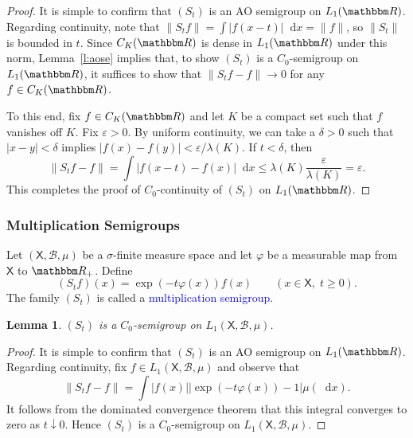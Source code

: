 \documentclass[12pt, reqno]{amsart}
\renewcommand{\leq}{\leqslant}
\renewcommand{\geq}{\geqslant}
\newcommand{\1}{\mathbbm 1}
\newcommand*\diff{\mathop{}\!\mathrm{d}}
\newcommand{\bB}{\mathcal B}
\newcommand{\RR}{\mathbbm R}
\newcommand{\Xsf}{\mathsf X}
\renewcommand{\phi}{\varphi}
\renewcommand{\epsilon}{\varepsilon}
\theoremstyle{plain}
\newtheorem{lemma}[theorem]{Lemma}
\theoremstyle{definition}
\newcommand{\navy}[1]{\textcolor{blue}{#1}}
\begin{document}
\begin{proof}
    It is simple to confirm that $(S_t)$ is an AO semigroup on $L_1(\RR)$.
    Regarding continuity, note that $\|S_t f\| = \int |f(x-t)| \diff x = \| f\|$, so
    $\|S_t\|$ is bounded in $t$.  Since $C_K(\RR)$ is dense in $L_1(\RR)$ under this
    norm, Lemma~\ref{l:aose} implies that, to show $(S_t)$ is a $C_0$-semigroup
    on $L_1(\RR)$, it suffices to show that $\| S_t f - f \| \to 0$ for any $f \in
    C_K(\RR)$.

    To this end, fix $f \in C_K(\RR)$ and let $K$ be a compact set such that $f$
    vanishes off $K$.  Fix $\epsilon > 0$.  By uniform continuity, we can take a
    $\delta > 0$ such that $|x-y| < \delta$ implies $|f(x) - f(y)| < \epsilon /
    \lambda(K)$.  If $t < \delta$, then
    \begin{equation*}
        \| S_t f - f \| 
        = \int | f(x-t) - f(x) | \diff x
        \leq \lambda(K) \frac{\epsilon}{\lambda(K)} = \epsilon.
    \end{equation*}
    This completes the proof of $C_0$-continuity of $(S_t)$ on $L_1(\RR)$.
\end{proof}


\subsubsection{Multiplication Semigroups}\label{ss:multisemi}

Let $(\Xsf, \bB, \mu)$ be a $\sigma$-finite measure space and let
$\phi$ be a measurable map from $\Xsf$ to $\RR_+$.  Define
%
\begin{equation*}
    (S_t f)(x)= \exp(-t \phi(x)) f(x) 
    \qquad (x \in \Xsf, \; t \geq 0).
\end{equation*}
%
The family $(S_t)$ is called a \navy{multiplication semigroup}.

\begin{lemma}\label{l:multisemi}
    $(S_t)$ is a $C_0$-semigroup on $L_1(\Xsf, \bB, \mu)$.
\end{lemma}

\begin{proof}
    It is simple to confirm that $(S_t)$ is an AO semigroup on $L_1(\RR)$.
    Regarding continuity, fix $f \in L_1(\Xsf, \bB, \mu)$ and observe that
    \begin{equation*}
        \| S_t f - f \|
        = \int |f(x)| | \exp(-t\phi(x)) - 1 | \mu(\diff x).
    \end{equation*}
    It follows from the dominated convergence theorem that this integral
    converges to zero as $t \downarrow 0$.  Hence $(S_t)$ is a $C_0$-semigroup
    on $L_1(\Xsf, \bB, \mu)$.
\end{proof}
\end{document}
